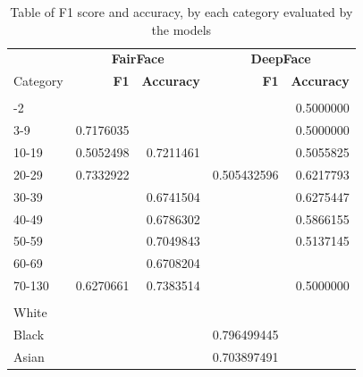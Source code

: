 \documentclass[
  letterpaper,
  DIV=11,
  numbers=noendperiod]{scrreprt}
\begin{document}
\hypertarget{tbl-model-perf}{}
\begin{longtable}{lrrrr}
\caption{\label{tbl-model-perf}Table of F1 score and accuracy, by each category evaluated by the models }\tabularnewline

\toprule
 & \multicolumn{2}{c}{\textbf{FairFace}} & \multicolumn{2}{c}{\textbf{DeepFace}} \\ 
\cmidrule(lr){2-3} \cmidrule(lr){4-5}
Category & \textbf{F1} & \textbf{Accuracy} & \textbf{F1} & \textbf{Accuracy} \\ 
\midrule\addlinespace[2.5pt]
\multicolumn{5}{l}{\textbf{Age}} \\ 
\midrule\addlinespace[2.5pt]
0-2 & \cellcolor[HTML]{CAFF70}{0.8959757} & \cellcolor[HTML]{CAFF70}{0.9172888} & \cellcolor[HTML]{FFA07A}{NA} & 0.5000000 \\ 
3-9 & 0.7176035 & \cellcolor[HTML]{CAFF70}{0.8772778} & \cellcolor[HTML]{FFA07A}{NA} & 0.5000000 \\ 
10-19 & 0.5052498 & 0.7211461 & \cellcolor[HTML]{FFA07A}{0.047860101} & 0.5055825 \\ 
20-29 & 0.7332922 & \cellcolor[HTML]{CAFF70}{0.8050592} & 0.505432596 & 0.6217793 \\ 
30-39 & \cellcolor[HTML]{FFA07A}{0.4670003} & 0.6741504 & \cellcolor[HTML]{FFA07A}{0.378631811} & 0.6275447 \\ 
40-49 & \cellcolor[HTML]{FFA07A}{0.3943970} & 0.6786302 & \cellcolor[HTML]{FFA07A}{0.227627841} & 0.5866155 \\ 
50-59 & \cellcolor[HTML]{FFA07A}{0.4633983} & 0.7049843 & \cellcolor[HTML]{FFA07A}{0.080167306} & 0.5137145 \\ 
60-69 & \cellcolor[HTML]{FFA07A}{0.3739425} & 0.6708204 & \cellcolor[HTML]{FFA07A}{0.001612903} & \cellcolor[HTML]{FFA07A}{0.4991769} \\ 
70-130 & 0.6270661 & 0.7383514 & \cellcolor[HTML]{FFA07A}{NA} & 0.5000000 \\ 
\midrule\addlinespace[2.5pt]
\multicolumn{5}{l}{\textbf{Race}} \\ 
\midrule\addlinespace[2.5pt]
White & \cellcolor[HTML]{CAFF70}{0.8610399} & \cellcolor[HTML]{CAFF70}{0.8788455} & \cellcolor[HTML]{CAFF70}{0.809546093} & \cellcolor[HTML]{CAFF70}{0.8365916} \\ 
Black & \cellcolor[HTML]{CAFF70}{0.8684858} & \cellcolor[HTML]{CAFF70}{0.8997692} & 0.796499445 & \cellcolor[HTML]{CAFF70}{0.8462797} \\ 
Asian & \cellcolor[HTML]{CAFF70}{0.8948932} & \cellcolor[HTML]{CAFF70}{0.9338128} & 0.703897491 & \cellcolor[HTML]{CAFF70}{0.9005150} \\ 

\end{longtable}
\end{document}
